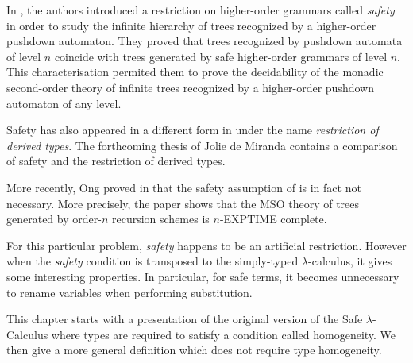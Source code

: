 
In \cite{KNU02}, the authors introduced a restriction on
higher-order grammars called \emph{safety} in order to study the
infinite hierarchy of trees recognized by a higher-order pushdown
automaton. They proved that trees recognized by pushdown automata of
level $n$ coincide with trees generated by safe higher-order
grammars of level $n$. This characterisation permited them to prove
the decidability of the monadic second-order theory of infinite
trees recognized by a higher-order pushdown automaton of any level.

Safety has also appeared in a different form in \cite{Dam82} under
the name \emph{restriction of derived types}. The forthcoming thesis
of Jolie de Miranda \citep{demirandathesis} contains a comparison of
safety and the restriction of derived types.

More recently, Ong proved in \cite{OngLics2006} that the safety
assumption of \cite{KNU02} is in fact not necessary. More precisely,
the paper shows that the MSO theory of trees generated by order-$n$
recursion schemes is $n$-EXPTIME complete.

For this particular problem, \emph{safety} happens to be an
artificial restriction. However when the \emph{safety} condition is
transposed to the simply-typed $\lambda$-calculus, it gives some
interesting properties. In particular, for safe terms, it becomes
unnecessary to rename variables when performing substitution.

This chapter starts with a presentation of the original version of
the Safe $\lambda$-Calculus where types are required to satisfy a
condition called homogeneity. We then give a more general definition
which does not require type homogeneity.

